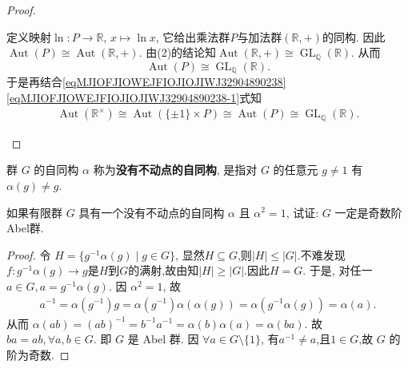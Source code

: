 \documentclass[../../main.tex]{subfiles}%
\begin{document}
\begin{proof}
\begin{enumerate}[(1)]
\begin{enumerate}[(i)]
定义映射$\ln:P\to\mathbb{R}$, $x\mapsto\ln x$, 它给出乘法群$P$与加法群$(\mathbb{R},+)$的同构. 因此$\operatorname{Aut}(P)\cong\operatorname{Aut}(\mathbb{R},+)$. 由(2)的结论知$\operatorname{Aut}(\mathbb{R},+)\cong\operatorname{GL}_{\mathbb{Q}}(\mathbb{R})$. 从而$$\operatorname{Aut}(P)\cong\operatorname{GL}_{\mathbb{Q}}(\mathbb{R}).$$
于是再结合\eqref{eqMJIOFJIOWEJFIOJIOJIWJ32904890238}\eqref{eqMJIOFJIOWEJFIOJIOJIWJ32904890238-1}式知
\begin{align*}
\operatorname{Aut}(\mathbb{R}^{\times})\cong \operatorname{Aut}(\{\pm 1\} \times P)\cong \operatorname{Aut}(P)\cong\operatorname{GL}_{\mathbb{Q}}(\mathbb{R}).
\end{align*}
\end{enumerate}
\end{enumerate}
\end{proof}

\begin{definition}
群 $G$ 的自同构 $\alpha$ 称为\textbf{没有不动点的自同构}, 是指对 $G$ 的任意元 $g \neq 1$ 有 $\alpha(g) \neq g$. 
\end{definition}

\begin{example}
如果有限群 $G$ 具有一个没有不动点的自同构 $\alpha$ 且 $\alpha^2 = 1$, 试证: $G$ 一定是奇数阶Abel群.
\end{example}
\begin{proof}
令 $H = \{g^{-1}\alpha(g) \mid g \in G\}$, 显然$H\subseteq G$,则$|H|\leqslant |G|$.不难发现$f:g^{-1}\alpha(g)\to g$是$H$到$G$的满射,故由知$|H|\geqslant |G|$.因此$H = G$. 
于是, 对任一 $a \in G, a = g^{-1}\alpha(g)$. 因 $\alpha^2 = 1$, 故
\begin{align*}
a^{-1} = \alpha(g^{-1})g = \alpha(g^{-1})\alpha(\alpha(g)) = \alpha(g^{-1}\alpha(g)) = \alpha(a).
\end{align*}
从而 $\alpha(ab) = (ab)^{-1} = b^{-1}a^{-1} = \alpha(b)\alpha(a) = \alpha(ba)$. 故 $ba = ab, \forall a, b \in G$. 即 $G$ 是 Abel 群. 因 $\forall a \in G\setminus\{1\}$, 有$a^{-1} \neq a$,且$1\in G$,故 $G$ 的阶为奇数.
\end{proof}
\end{document}
